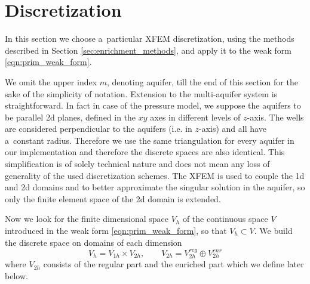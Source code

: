 \section{Discretization}
\label{sec:prim_discretization}
In this section we choose a~particular XFEM discretization, using the methods described in Section \ref{sec:enrichment_methods},
and apply it to the weak form \eqref{eqn:prim_weak_form}.

We omit the upper index $m$, denoting aquifer, till the end of this section for the sake of the simplicity of notation.
Extension to the multi-aquifer system is straightforward. In fact in case of the pressure model, we suppose the aquifers
to be parallel 2d planes, defined in the $xy$ axes in different levels of $z$-axis. 
The wells are considered perpendicular to the aquifers (i.e. in $z$-axis) and all have a~constant radius.
Therefore we use the same triangulation for every aquifer in our implementation and therefore the discrete spaces are also identical.
This simplification is of solely technical nature and does not mean any loss of generality of the used discretization schemes.
The XFEM is used to couple the 1d and 2d domains and to better approximate the singular solution in the aquifer,
so only the finite element space of the 2d domain is extended.

Now we look for the finite dimensional space $V_h$ of the continuous space $V$ introduced in the weak form \eqref{eqn:prim_weak_form},
so that $V_h\subset V$. We build the discrete space on domains of each dimension
\begin{equation}
    V_h = V_{1h} \times V_{2h}, \qquad V_{2h} = V_{2h}^{reg} \oplus V_{2h}^{enr}
\end{equation}
where $V_{2h}$ consists of the regular part and the enriched part which we define later below.

